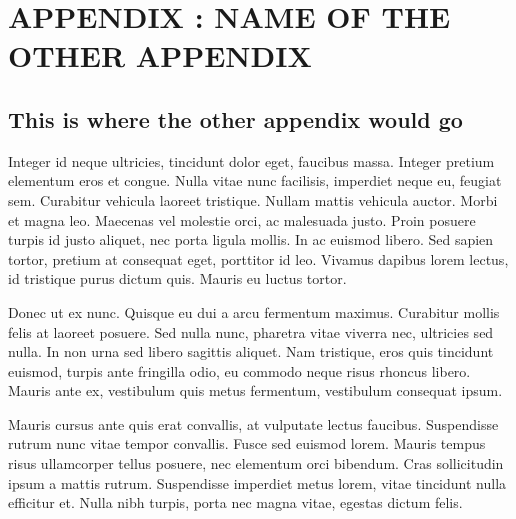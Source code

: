 \chapter*{APPENDIX \thechapter: NAME OF THE OTHER APPENDIX}

\vspace{-22pt}

\section*{This is where the other appendix would go}

Integer id neque ultricies, tincidunt dolor eget, faucibus massa. Integer pretium elementum eros et congue. Nulla vitae nunc facilisis, imperdiet neque eu, feugiat sem. Curabitur vehicula laoreet tristique. Nullam mattis vehicula auctor. Morbi et magna leo. Maecenas vel molestie orci, ac malesuada justo. Proin posuere turpis id justo aliquet, nec porta ligula mollis. In ac euismod libero. Sed sapien tortor, pretium at consequat eget, porttitor id leo. Vivamus dapibus lorem lectus, id tristique purus dictum quis. Mauris eu luctus tortor.

Donec ut ex nunc. Quisque eu dui a arcu fermentum maximus. Curabitur mollis felis at laoreet posuere. Sed nulla nunc, pharetra vitae viverra nec, ultricies sed nulla. In non urna sed libero sagittis aliquet. Nam tristique, eros quis tincidunt euismod, turpis ante fringilla odio, eu commodo neque risus rhoncus libero. Mauris ante ex, vestibulum quis metus fermentum, vestibulum consequat ipsum.

Mauris cursus ante quis erat convallis, at vulputate lectus faucibus. Suspendisse rutrum nunc vitae tempor convallis. Fusce sed euismod lorem. Mauris tempus risus ullamcorper tellus posuere, nec elementum orci bibendum. Cras sollicitudin ipsum a mattis rutrum. Suspendisse imperdiet metus lorem, vitae tincidunt nulla efficitur et. Nulla nibh turpis, porta nec magna vitae, egestas dictum felis.

